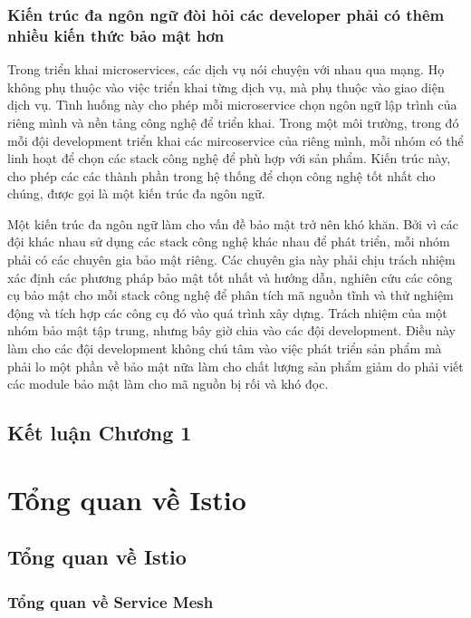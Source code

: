 \documentclass[12pt,a4paper]{report}
\begin{document}
			\subsection{Kiến trúc đa ngôn ngữ đòi hỏi các developer phải có thêm nhiều kiến thức bảo mật hơn}
				{\hspace{0.6cm}Trong triển khai microservices, các dịch vụ nói chuyện với nhau qua mạng. Họ không phụ thuộc vào việc triển khai từng dịch vụ, mà phụ thuộc vào giao diện dịch vụ. Tình huống này cho phép mỗi microservice chọn ngôn ngữ lập trình của riêng mình và nền tảng công nghệ để triển khai. Trong một môi trường, trong đó mỗi đội development triển khai các mircoservice của riêng mình, mỗi nhóm có thể linh hoạt để chọn các stack công nghệ để phù hợp với sản phẩm. Kiến trúc này, cho phép các các thành phần trong hệ thống để chọn công nghệ tốt nhất cho chúng, được gọi là một kiến trúc đa ngôn ngữ.\\}
				
				Một kiến trúc đa ngôn ngữ làm cho vấn đề bảo mật trở nên khó khăn. Bởi vì các đội khác nhau sử dụng các stack công nghệ khác nhau để phát triển, mỗi nhóm phải có các chuyên gia bảo mật riêng. Các chuyên gia này phải chịu trách nhiệm xác định các phương pháp bảo mật tốt nhất và hướng dẫn, nghiên cứu các công cụ bảo mật cho mỗi stack công nghệ để phân tích mã nguồn tĩnh và thử nghiệm động và tích hợp các công cụ đó vào quá trình xây dựng. Trách nhiệm của một nhóm bảo mật tập trung, nhưng bây giờ chia vào các đội development. Điều này làm cho các đội development không chú tâm vào việc phát triển sản phẩm mà phải lo một phần về bảo mật nữa làm cho chất lượng sản phẩm giảm do phải viết các module bảo mật làm cho mã nguồn bị rối và khó đọc.
				
				
		\section*{Kết luận Chương 1}
	
	\chapter{Tổng quan về Istio}
		\section{Tổng quan về Istio}
			\subsection{Tổng quan về Service Mesh}
\end{document}
